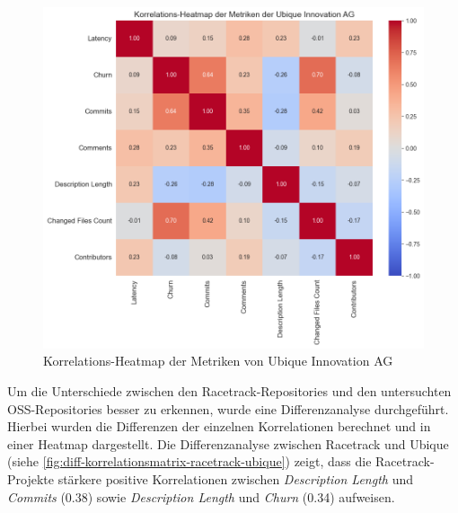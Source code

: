 \begin{figure}[htbp]
\includegraphics[width=\textwidth]{Figures/ubique-korrelationsmatrix.png}
\caption{Korrelations-Heatmap der Metriken von Ubique Innovation AG}
\label{fig:korrelationsmatrix-ubique}
\end{figure}


Um die Unterschiede zwischen den Racetrack-Repositories und den untersuchten OSS-Repositories besser zu erkennen, wurde eine Differenzanalyse durchgeführt. Hierbei wurden die Differenzen der einzelnen Korrelationen berechnet und in einer Heatmap dargestellt. Die Differenzanalyse zwischen Racetrack und Ubique (siehe \autoref{fig:diff-korrelationsmatrix-racetrack-ubique}) zeigt, dass die Racetrack-Projekte stärkere positive Korrelationen zwischen \textit{Description Length} und \textit{Commits} (0.38) sowie \textit{Description Length} und \textit{Churn} (0.34) aufweisen.

